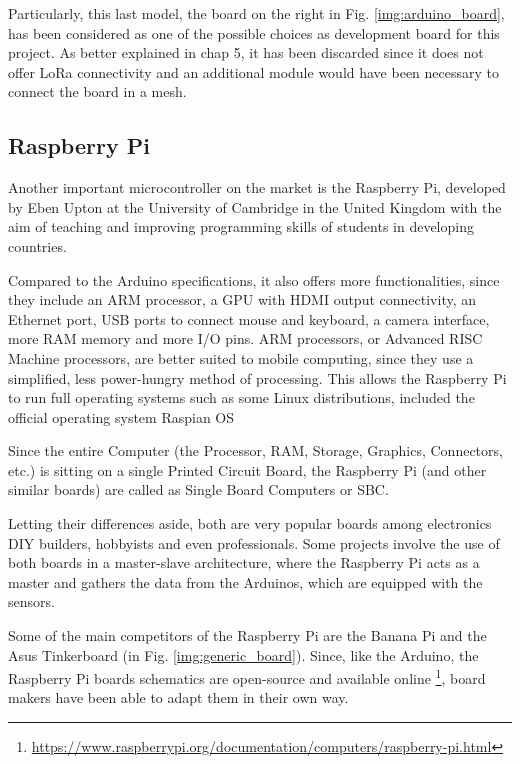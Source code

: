 			Particularly, this last model, the board on the right in Fig. \ref{img:arduino_board}, has been considered as one of the possible choices as development board for this project.
			As better explained in chap 5, it has been discarded since it does not offer LoRa connectivity and an additional module would have been necessary to connect the board in a mesh.
								
		\subsection{Raspberry Pi}
	
			Another important microcontroller on the market is the Raspberry Pi, developed by Eben Upton at the University of Cambridge in the United Kingdom with the aim of teaching and improving programming skills of students in developing countries.
			
			Compared to the Arduino specifications, it also offers more functionalities, since they include an ARM processor, a GPU with HDMI output connectivity, an Ethernet port, USB ports to connect mouse and keyboard, a camera interface, more RAM memory and more I/O pins.
			ARM processors, or Advanced RISC Machine processors, are better suited to mobile computing, since they use a simplified, less power-hungry method of processing.
			This allows the Raspberry Pi to run full operating systems such as some Linux distributions, included the official operating system Raspian OS
			
			Since the entire Computer (the Processor, RAM, Storage, Graphics, Connectors, etc.) is sitting on a single Printed Circuit Board, the Raspberry Pi (and other similar boards) are called as Single Board Computers or SBC.
			
			Letting their differences aside, both are very popular boards among electronics DIY builders, hobbyists and even professionals.
			Some projects involve the use of both boards in a master-slave architecture, where the Raspberry Pi acts as a master and gathers the data from the Arduinos, which are equipped with the sensors.
			
			Some of the main competitors of the Raspberry Pi are the Banana Pi and the Asus Tinkerboard (in Fig. \ref{img:generic_board}).
			Since, like the Arduino, the Raspberry Pi boards schematics are open-source and available online \footnote{\url{https://www.raspberrypi.org/documentation/computers/raspberry-pi.html}}, board makers have been able to adapt them in their own way.
	
